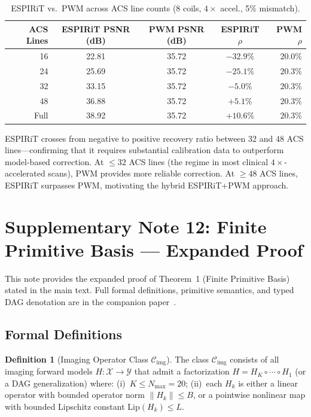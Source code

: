 \documentclass[11pt]{article}
\theoremstyle{definition}
\newtheorem{definition}[theorem]{Definition}
\begin{document}
\begin{table}[ht]
\centering\small
\caption{ESPIRiT vs.\ PWM across ACS line counts (8 coils, $4\times$ accel., 5\% mismatch).}
\label{tab:espirit_extended}
\begin{tabular}{@{}rcccr@{}}
\toprule
ACS Lines & ESPIRiT PSNR (dB) & PWM PSNR (dB) & ESPIRiT $\rho$ & PWM $\rho$ \\
\midrule
16  & 22.81 & 35.72 & $-32.9\%$  & $20.0\%$ \\
24  & 25.69 & 35.72 & $-25.1\%$  & $20.3\%$ \\
32  & 33.15 & 35.72 & $-5.0\%$   & $20.3\%$ \\
48  & 36.88 & 35.72 & $+5.1\%$   & $20.3\%$ \\
Full & 38.92 & 35.72 & $+10.6\%$ & $20.3\%$ \\
\bottomrule
\end{tabular}
\end{table}

\noindent ESPIRiT crosses from negative to positive recovery ratio between 32 and 48 ACS lines---confirming that it requires substantial calibration data to outperform model-based correction. At $\leq 32$ ACS lines (the regime in most clinical $4\times$-accelerated scans), PWM provides more reliable correction. At $\geq 48$ ACS lines, ESPIRiT surpasses PWM, motivating the hybrid ESPIRiT+PWM approach.


\section{Supplementary Note 12: Finite Primitive Basis --- Expanded Proof}
\label{sec:fpb_proof}

This note provides the expanded proof of Theorem~1 (Finite Primitive Basis) stated in the main text. Full formal definitions, primitive semantics, and typed DAG denotation are in the companion paper~\cite{yang2026fpt}.

\subsection{Formal Definitions}

\begin{definition}[Imaging Operator Class $\mathcal{C}_{\mathrm{img}}$]
\label{def:ctier_supp}
The class $\mathcal{C}_{\mathrm{img}}$ consists of all imaging forward models $H: \mathcal{X} \to \mathcal{Y}$ that admit a factorization $H = H_K \circ \cdots \circ H_1$ (or a DAG generalization) where: (i)~$K \leq N_{\max} = 20$; (ii)~each $H_k$ is either a linear operator with bounded operator norm $\|H_k\| \leq B$, or a pointwise nonlinear map with bounded Lipschitz constant $\mathrm{Lip}(H_k) \leq L$.
\end{definition}
\end{document}
